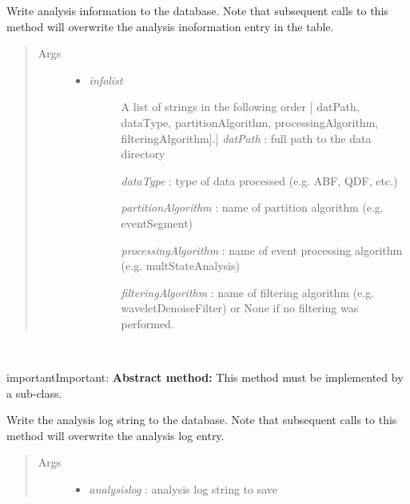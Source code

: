 \documentclass[letterpaper,10pt,english]{sphinxmanual}
\begin{document}
\begin{fulllineitems}
\begin{fulllineitems}
Write analysis information to the database. Note that subsequent calls to this method will overwrite the analysis inoformation entry in the table.
\begin{quote}\begin{description}
\item[{Args}] \leavevmode\begin{itemize}
\item {} \begin{description}
\item[{\emph{infolist}}] \leavevmode{[}A list of strings in the following order {[} datPath, dataType, partitionAlgorithm, processingAlgorithm, filteringAlgorithm{]}.{]}
\emph{datPath}                               : full path to the data directory

\emph{dataType}                              : type of data processed (e.g. ABF, QDF, etc.)

\emph{partitionAlgorithm}    : name of partition algorithm (e.g. eventSegment)

\emph{processingAlgorithm}   : name of event processing algorithm (e.g. multStateAnalysis)

\emph{filteringAlgorithm}    : name of filtering algorithm (e.g. waveletDenoiseFilter) or None if no filtering was performed.

\end{description}

\end{itemize}

\end{description}\end{quote}

\end{fulllineitems}


\begin{fulllineitems}
\label{api-doc/mosaic.meta:mosaic.metaMDIO.metaMDIO.writeAnalysisLog}~
\begin{notice}{important}{Important:}
\textbf{Abstract method:} This method must be implemented by a sub-class.
\end{notice}

Write the analysis log string to the database. Note that subsequent calls to this method will overwrite the analysis log entry.
\begin{quote}\begin{description}
\item[{Args}] \leavevmode\begin{itemize}
\item {} 
\emph{analysislog} :       analysis log string to save


\end{itemize}
\end{description}
\end{quote}
\end{fulllineitems}
\end{fulllineitems}
\end{document}
